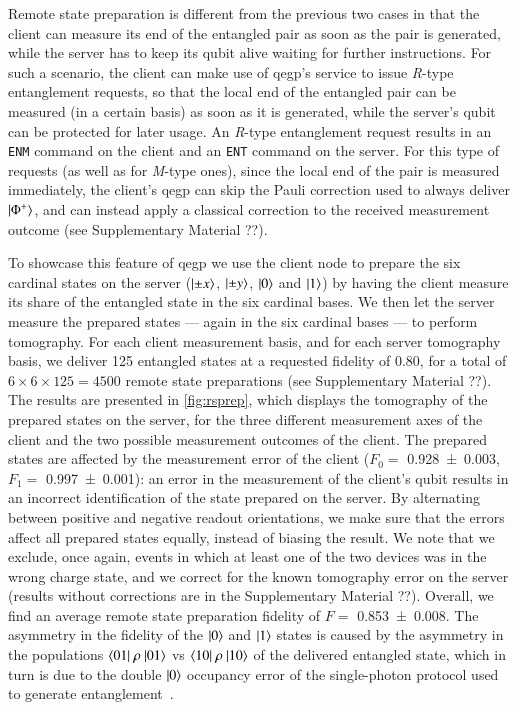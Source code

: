 Remote state preparation is different from the previous two cases in that the client can measure its
end of the entangled pair as soon as the pair is generated, while the server has to keep its qubit
alive waiting for further instructions. For such a scenario, the client can make use of
\acrshort{qegp}'s service to issue \emph{R}-type entanglement requests, so that the local end of the
entangled pair can be measured (in a certain basis) as soon as it is generated, while the server's
qubit can be protected for later usage. An \emph{R}-type entanglement request results in an
\texttt{ENM} command on the client and an \texttt{ENT} command on the server. For this type of
requests (as well as for \emph{M}-type ones), since the local end of the pair is measured
immediately, the client's \acrshort{qegp} can skip the Pauli correction used to always deliver
$\ket{\Phi^+}$, and can instead apply a classical correction to the received measurement outcome
(see Supplementary Material ??).

To showcase this feature of \acrshort{qegp} we use the client node to prepare the six cardinal
states on the server ($\ket{\pm x}$, $\ket{\pm y}$, $\ket{0}$ and $\ket{1}$) by having the client
measure its share of the entangled state in the six cardinal bases. We then let the server measure
the prepared states --- again in the six cardinal bases --- to perform tomography. For each client
measurement basis, and for each server tomography basis, we deliver \num{125} entangled states at a
requested fidelity of \num{0.80}, for a total of $6 \times 6 \times 125 = 4500$ remote state
preparations (see Supplementary Material ??). The results are presented in \cref{fig:rsprep}, which
displays the tomography of the prepared states on the server, for the three different measurement
axes of the client and the two possible measurement outcomes of the client. The prepared states are
affected by the measurement error of the client ($F_0 =$ \num{0.928(3)}, $F_1 = $ \num{0.997(1)}):
an error in the measurement of the client's qubit results in an incorrect identification of the
state prepared on the server. By alternating between positive and negative readout orientations, we
make sure that the errors affect all prepared states equally, instead of biasing the result. We note
that we exclude, once again, events in which at least one of the two devices was in the wrong charge
state, and we correct for the known tomography error on the server (results without corrections are
in the Supplementary Material ??). Overall, we find an average remote state preparation fidelity of
$F =$ \num{0.853(8)}. The asymmetry in the fidelity of the $\ket{0}$ and $\ket{1}$ states is caused
by the asymmetry in the populations $\braket{01|\ \rho\ |01}$ vs $\braket{10|\ \rho\ |10}$ of the
delivered entangled state, which in turn is due to the double $\ket{0}$ occupancy error of the
single-photon protocol used to generate entanglement~\cite{humphreys_2018_delivery,
pompili_2021_multinode}.

